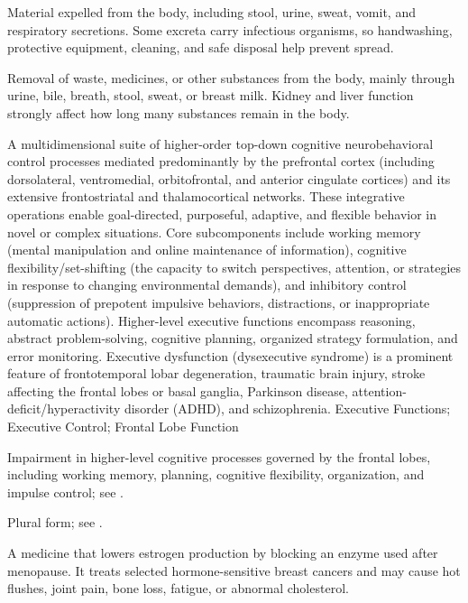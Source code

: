  Material expelled from the body, including stool, urine, sweat, vomit, and respiratory secretions. Some excreta carry infectious organisms, so handwashing, protective equipment, cleaning, and safe disposal help prevent spread.

 Removal of waste, medicines, or other substances from the body, mainly through urine, bile, breath, stool, sweat, or breast milk. Kidney and liver function strongly affect how long many substances remain in the body.

 A multidimensional suite of higher-order top-down cognitive neurobehavioral control processes mediated predominantly by the prefrontal cortex (including dorsolateral, ventromedial, orbitofrontal, and anterior cingulate cortices) and its extensive frontostriatal and thalamocortical networks. These integrative operations enable goal-directed, purposeful, adaptive, and flexible behavior in novel or complex situations. Core subcomponents include working memory (mental manipulation and online maintenance of information), cognitive flexibility/set-shifting (the capacity to switch perspectives, attention, or strategies in response to changing environmental demands), and inhibitory control (suppression of prepotent impulsive behaviors, distractions, or inappropriate automatic actions). Higher-level executive functions encompass reasoning, abstract problem-solving, cognitive planning, organized strategy formulation, and error monitoring. Executive dysfunction (dysexecutive syndrome) is a prominent feature of frontotemporal lobar degeneration, traumatic brain injury, stroke affecting the frontal lobes or basal ganglia, Parkinson disease, attention-deficit/hyperactivity disorder (ADHD), and schizophrenia.
\synonyms
Executive Functions; Executive Control; Frontal Lobe Function

 Impairment in higher-level cognitive processes governed by the frontal lobes, including working memory, planning, cognitive flexibility, organization, and impulse control; see .

 Plural form; see .

 A medicine that lowers estrogen production by blocking an enzyme used after menopause. It treats selected hormone-sensitive breast cancers and may cause hot flushes, joint pain, bone loss, fatigue, or abnormal cholesterol.

